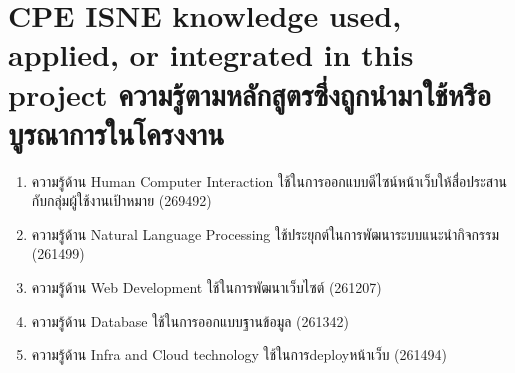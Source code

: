 






\section{\ifenglish%
\ifcpe CPE \else ISNE \fi knowledge used, applied, or integrated in this project
\else%
ความรู้ตามหลักสูตรซึ่งถูกนำมาใช้หรือบูรณาการในโครงงาน
\fi
}
\begin{enumerate}
    \item ความรู้ด้าน Human Computer Interaction ใช้ในการออกแบบดีไซน์หน้าเว็บให้สื่อประสานกับกลุ่มผู้ใช้งานเป้าหมาย (269492)
    \item ความรู้ด้าน Natural Language Processing ใช้ประยุกต์ในการพัฒนาระบบแนะนำกิจกรรม (261499)
    \item ความรู้ด้าน Web Development ใช้ในการพัฒนาเว็บไซต์ (261207)
    \item ความรู้ด้าน Database ใช้ในการออกแบบฐานข้อมูล (261342)
    \item ความรู้ด้าน Infra and Cloud technology ใช้ในการdeployหน้าเว็บ (261494)
\end{enumerate}


